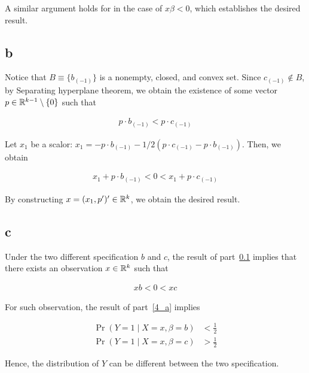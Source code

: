 \documentclass[11pt]{article}
\begin{document}
A similar argument holds for in the case of $x\beta < 0$, which establishes the desired result.

\subsection{b}\label{q:4_b}

Notice that $B \equiv \{b_{(-1)}\}$ is a nonempty, closed, and convex set. Since $c_{(-1)} \notin B$, by Separating hyperplane theorem, we obtain the existence of some vector $p \in \mathbb{R}^{k-1}\setminus \{0\}$ such that

\begin{align*}
    p \cdot b_{(-1)} < p \cdot c_{(-1)}
\end{align*}

Let $x_1$ be a scalor: $x_1 = - p \cdot b_{(-1)} - 1/2 (p\cdot c_{(-1)} - p \cdot b_{(-1)})$. Then, we obtain

\begin{align*}
    x_1 + p \cdot b_{(-1)} < 0 < x_1 + p \cdot c_{(-1)}
\end{align*}

By constructing $x = (x_1, p^\prime)^\prime \in \mathbb{R}^k$, we obtain the desired result.

\subsection{c}

Under the two different specification $b$ and $c$, the result of part~\ref{q:4_b} implies that there exists an observation $x \in \mathbb{R}^k$ such that

\begin{align*}
    xb < 0 < xc
\end{align*}

For such observation, the result of part~\ref{4_a} implies

\begin{align*}
    \Pr(Y = 1 \mid X = x, \beta = b) &< \frac{1}{2} \\
    \Pr(Y = 1 \mid X = x, \beta = c) &> \frac{1}{2}
\end{align*}

Hence, the distribution of $Y$ can be different between the two specification.
\end{document}
